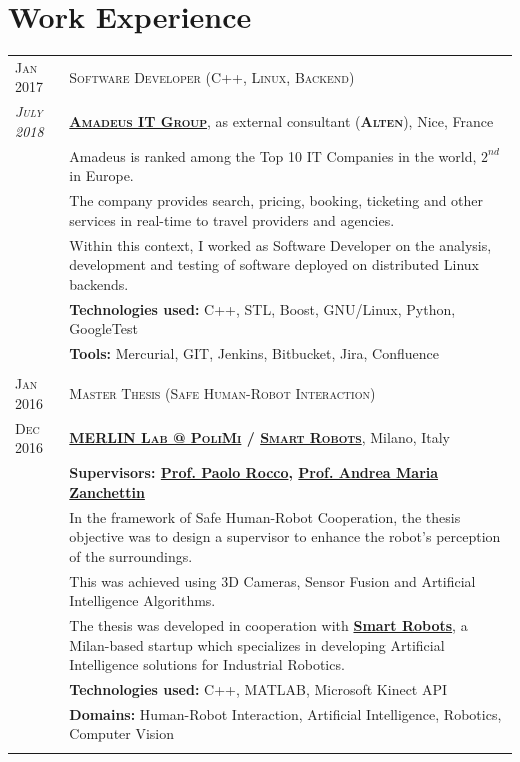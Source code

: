 \documentclass[a4paper,10pt]{article}
\begin{document}
	\section{Work Experience}
	\begin{tabular}{p{2cm}|p{13.8cm}}
		\centering\textsc{Jan 2017} &
		\textsc{Software Developer (C++, Linux, Backend)} \\
		\centering\emph{\textsc{July 2018}} &
		\textsc{\textbf{\href{http://www.amadeus.com/}{Amadeus IT Group}}}, as external consultant (\textsc{\textbf{Alten}}), \hfill Nice, France\\
		& Amadeus is ranked among the Top 10 IT Companies in the world, $2^{nd}$ in Europe.\\
		& The company provides search, pricing, booking, ticketing and other services in real-time to travel providers and agencies.\\
		& Within this context, I worked as Software Developer on the analysis, development and testing of software deployed on distributed Linux backends.\\
		& \textbf{Technologies used:} C++, STL, Boost, GNU/Linux, Python, GoogleTest\\
		& \textbf{Tools:} Mercurial, GIT, Jenkins, Bitbucket, Jira, Confluence\\

		\multicolumn{2}{c}{} \\
		\centering\textsc{Jan 2016 } & 
		\textsc{Master Thesis (Safe Human-Robot Interaction)} \\
		\centering\textsc{Dec 2016} &
		\textsc{\textbf{\href{http://merlin.dei.polimi.it/}{MERLIN Lab @ PoliMi} / \href{http://smartrobots.it/en/}{Smart Robots}}}, \hfill Milano, Italy\\
		& \textbf{Supervisors: \href{http://home.deib.polimi.it/rocco/}{Prof. Paolo Rocco}, \href{https://home.deib.polimi.it/zanchettin/index.html}{Prof. Andrea Maria Zanchettin}}\\
		& In the framework of Safe Human-Robot Cooperation, the thesis objective was to design a supervisor to enhance the robot's perception of the surroundings.\\
		& This was achieved using 3D Cameras, Sensor Fusion and Artificial Intelligence Algorithms.\\
		& The thesis was developed in cooperation with \textbf{\href{http://smartrobots.it/en/}{Smart Robots}}, a Milan-based startup which specializes in developing Artificial Intelligence solutions for Industrial Robotics.\\
		& \textbf{Technologies used:}  C++, MATLAB, Microsoft Kinect API\\
		& \textbf{Domains:} Human-Robot Interaction, Artificial Intelligence, Robotics, Computer Vision\\
		\multicolumn{2}{c}{} \\
	\end{tabular}
\end{document}
